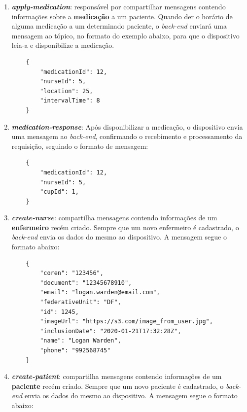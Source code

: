 \begin{enumerate}
    \item \textbf{\textit{apply-medication}}: responsável por compartilhar mensagens contendo informações sobre a \textbf{medicação} a um paciente. Quando der o horário de alguma medicação a um determinado paciente, o \textit{back-end} enviará uma mensagem ao tópico, no formato do exemplo abaixo, para que o dispositivo leia-a e disponibilize a medicação.
    
    \begin{verbatim}
    {
        "medicationId": 12,
        "nurseId": 5,
        "location": 25,
        "intervalTime": 8
    }
    \end{verbatim}
    
    \item \textbf{\textit{medication-response}}: Após disponibilizar a medicação, o dispositivo envia uma mensagem ao \textit{back-end}, confirmando o recebimento e processamento da requisição, seguindo o formato de mensagem:
    
    \begin{verbatim}
    {
        "medicationId": 12,
        "nurseId": 5,
        "cupId": 1,
    }
    \end{verbatim}
    
    \item \textbf{\textit{create-nurse}}: compartilha mensagens contendo informações de um \textbf{enfermeiro} recém criado. Sempre que um novo enfermeiro é cadastrado, o \textit{back-end} envia os dados do mesmo ao dispositivo. A mensagem segue o formato abaixo:
    
    \begin{verbatim}
    {
        "coren": "123456",
        "document": "12345678910",
        "email": "logan.warden@email.com",
        "federativeUnit": "DF",
        "id": 1245,
        "imageUrl": "https://s3.com/image_from_user.jpg",
        "inclusionDate": "2020-01-21T17:32:28Z",
        "name": "Logan Warden",
        "phone": "992568745"
    }
    \end{verbatim}
    
    \item \textbf{\textit{create-patient}}: compartilha mensagens contendo informações de um \textbf{paciente} recém criado. Sempre que um novo paciente é cadastrado, o \textit{back-end} envia os dados do mesmo ao dispositivo. A mensagem segue o formato abaixo:
    

\end{enumerate}
